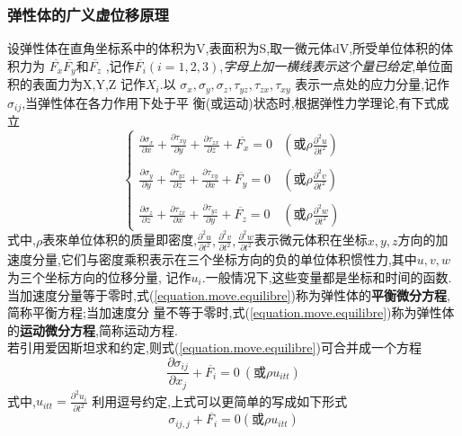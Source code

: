 \documentclass{book}
\begin{document}
\subsubsection{弹性体的广义虚位移原理}
设弹性体在直角坐标系中的体积为V,表面积为S,取一微元体dV,所受单位体积的体积力为 $\overline{F_x} \overline{F_y}\mbox{和} \overline{F_z} $ ,记作$\overline{F_i}(i=1,2,3)$,\emph{字母上加一横线表示这个量已给定},单位面积的表面力为X,Y,Z 记作$X_i$.以
$ \sigma_x, \sigma_y, \sigma_z, \tau_{yz},\tau_{zx},\tau_{xy} $
表示一点处的应力分量,记作$\sigma_{ij}$,当弹性体在各力作用下处于平 衡(或运动)状态时,根据弹性力学理论,有下式成立
\begin{equation}
  \left\{
	\begin{array}{ll}
	 \frac{\partial \sigma_x}{\partial x}+ \frac{\partial \tau_{xy}}{\partial y}+ \frac{\partial \tau_{zx}}{\partial z}+ \overline{F_x}=0 & (\mbox{或}\rho\frac{\partial ^2u}{\partial t^2}) \\\\
	 \frac{\partial \sigma_y}{\partial y}+ \frac{\partial \tau_{yz}}{\partial z}+ \frac{\partial \tau_{xy}}{\partial x}+ \overline{F_y}=0 & (\mbox{或}\rho\frac{\partial ^2v}{\partial t^2}) \\\\
	 \frac{\partial \sigma_z}{\partial z}+ \frac{\partial \tau_{zx}}{\partial x}+ \frac{\partial \tau_{yz}}{\partial y}+ \overline{F_z}=0 & (\mbox{或}\rho\frac{\partial ^2w}{\partial t^2})
	\end{array}
	\right.
\label{equation.move.equilibre}
\end{equation}
式中,$\rho$表來单位体积的质量即密度,$\frac{\partial ^2u}{\partial t^2},\frac{\partial ^2v}{\partial t^2},\frac{\partial ^2w}{\partial t^2}$表示微元体积在坐标$x,y,z$方向的加速度分量,它们与密度乘积表示在三个坐标方向的负的单位体积惯性力,其中$u,v,w$为三个坐标方向的位移分量,
记作$u_i$.一般情况下,这些变量都是坐标和时间的函数.
当加速度分量等于零时,式(\ref{equation.move.equilibre})称为弹性体的\textbf{平衡微分方程},简称平衡方程;当加速度分
量不等于零时,式(\ref{equation.move.equilibre})称为弹性体的\textbf{运动微分方程},简称运动方程.
\\
若引用爱因斯坦求和约定,则式(\ref{equation.move.equilibre})可合并成一个方程
\begin{equation}
 \frac{\partial \sigma_{ij}}{\partial x_j} + \overline{F_i}=0 ~(\mbox{或}\rho u_{itt})
\end{equation}
式中,$u_{itt}=\frac{\partial ^2 u_i}{\partial t^2}$
利用逗号约定,上式可以更简单的写成如下形式
\begin{equation}
 \sigma_{ij,j} + \overline{F_i}=0 (\mbox{或}\rho u_{itt})
\end{equation}
\end{document}
